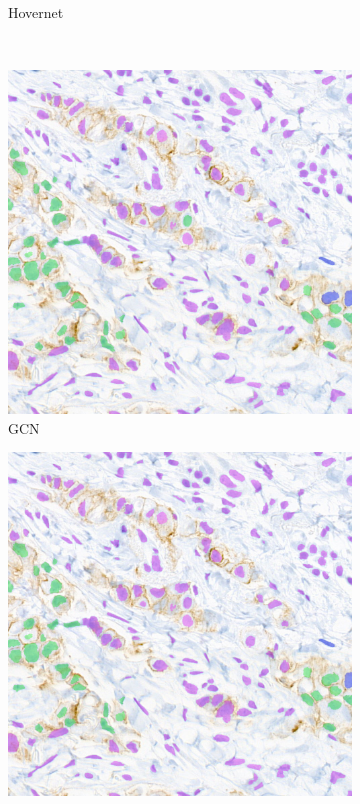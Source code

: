 \begin{figure}[H]
\begin{subfigure}[b]{0.45\textwidth}
    \caption{Hovernet}
    \label{fig:breast-hov2}
  \end{subfigure}
  \\
  \begin{subfigure}[b]{0.45\textwidth}
    \includegraphics[width=\textwidth]{imgs/qual/breast/gcn-full2.png}
    \caption{GCN}
    \label{fig:breast-gcn2}
  \end{subfigure}
  \hfill
  \begin{subfigure}[b]{0.45\textwidth}
    \includegraphics[width=\textwidth]{imgs/qual/breast/no-morph2.png}

\end{subfigure}
\end{figure}
